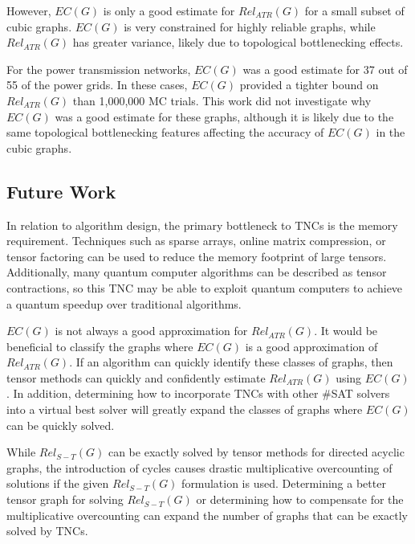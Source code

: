 However, \(EC(G)\) is only a good estimate for \(Rel_{ATR}(G)\) for a small subset of cubic graphs. \(EC(G)\) is very constrained for highly reliable graphs, while \(Rel_{ATR}(G)\) has greater variance, likely due to topological bottlenecking effects.

For the power transmission networks, \(EC(G)\) was a good estimate for 37 out of 55 of the power grids. In these cases, \(EC(G)\) provided a tighter bound on \(Rel_{ATR}(G)\) than 1,000,000 MC trials. This work did not investigate why \(EC(G)\) was a good estimate for these graphs, although it is likely due to the same topological bottlenecking features affecting the accuracy of \(EC(G)\) in the cubic graphs.

\hypertarget{future-work}{%
\subsection{Future Work}\label{future-work}}

In relation to algorithm design, the primary bottleneck to TNCs is the memory requirement. Techniques such as sparse arrays, online matrix compression, or tensor factoring can be used to reduce the memory footprint of large tensors. Additionally, many quantum computer algorithms can be described as tensor contractions, so this TNC may be able to exploit quantum computers to achieve a quantum speedup over traditional algorithms.

\(EC(G)\) is not always a good approximation for \(Rel_{ATR}(G)\). It would be beneficial to classify the graphs where \(EC(G)\) is a good approximation of \(Rel_{ATR}(G)\). If an algorithm can quickly identify these classes of graphs, then tensor methods can quickly and confidently estimate \(Rel_{ATR}(G)\) using \(EC(G)\). In addition, determining how to incorporate TNCs with other \#SAT solvers into a virtual best solver will greatly expand the classes of graphs where \(EC(G)\) can be quickly solved.

While \(Rel_{S-T}(G)\) can be exactly solved by tensor methods for directed acyclic graphs, the introduction of cycles causes drastic multiplicative overcounting of solutions if the given \(Rel_{S-T}(G)\) formulation is used. Determining a better tensor graph for solving \(Rel_{S-T}(G)\) or determining how to compensate for the multiplicative overcounting can expand the number of graphs that can be exactly solved by TNCs.
